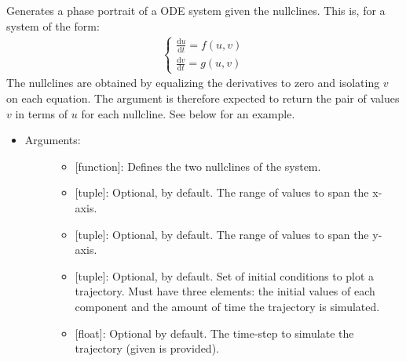 \documentclass[letterpaper,10pt,english]{sphinxmanual}
\begin{document}
\begin{fulllineitems}
\label{\detokenize{plots:data_tools.plots.phase_portrait}}
Generates a phase portrait of a ODE system given the nullclines.
This is, for a system of the form:
\begin{equation*}
\begin{split}\left\{\begin{array}{l}
\frac{\text{d}u}{\text{d}t}=f(u,v)\\
\frac{\text{d}v}{\text{d}t}=g(u,v)
\end{array}\right.\end{split}
\end{equation*}
The nullclines are obtained by equalizing the derivatives to zero
and isolating \(v\) on each equation. The argument  is
therefore expected to return the pair of values \(v\) in terms
of \(u\) for each nullcline. See below for an example.
\begin{itemize}
\item {} \begin{description}
\item[{Arguments:}] \leavevmode\begin{itemize}
\item {} 
 {[}function{]}: Defines the two nullclines of the system.

\item {} 
 {[}tuple{]}: Optional,  by default. The range of
values to span the x-axis.

\item {} 
 {[}tuple{]}: Optional,  by default. The range of
values to span the y-axis.

\item {} 
 {[}tuple{]}: Optional,  by default. Set of initial
conditions to plot a trajectory. Must have three elements: the
initial values of each component and the amount of time the
trajectory is simulated.

\item {} 
 {[}float{]}: Optional  by default. The time-step to
simulate the trajectory (given  is provided).


\end{itemize}
\end{description}
\end{itemize}
\end{fulllineitems}
\end{document}
